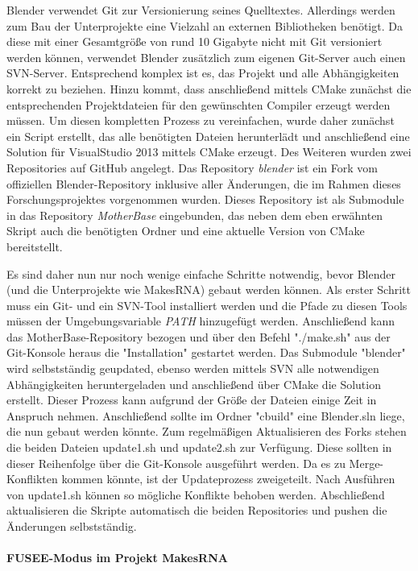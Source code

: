 Blender verwendet Git zur Versionierung seines Quelltextes. Allerdings werden zum Bau der Unterprojekte eine Vielzahl an externen Bibliotheken benötigt. Da diese mit einer Gesamtgröße von rund 10 Gigabyte nicht mit Git versioniert werden können, verwendet Blender zusätzlich zum eigenen Git-Server auch einen SVN-Server. Entsprechend komplex ist es, das Projekt und alle Abhängigkeiten korrekt zu beziehen. Hinzu kommt, dass anschließend mittels CMake zunächst die entsprechenden Projektdateien für den gewünschten Compiler erzeugt werden müssen. Um diesen kompletten Prozess zu vereinfachen, wurde daher zunächst ein Script erstellt, das alle benötigten Dateien herunterlädt und anschließend eine Solution für VisualStudio 2013 mittels CMake erzeugt. Des Weiteren wurden zwei Repositories auf GitHub angelegt. Das Repository \emph{blender} ist ein Fork vom offiziellen Blender-Repository inklusive aller Änderungen, die im Rahmen dieses Forschungsprojektes vorgenommen wurden. Dieses Repository ist als Submodule in das Repository \emph{MotherBase} eingebunden, das neben dem eben erwähnten Skript auch die benötigten Ordner und eine aktuelle Version von CMake bereitstellt.

Es sind daher nun nur noch wenige einfache Schritte notwendig, bevor Blender (und die Unterprojekte wie MakesRNA) gebaut werden können. Als erster Schritt muss ein Git- und ein SVN-Tool installiert werden und die Pfade zu diesen Tools müssen der Umgebungsvariable \emph{PATH} hinzugefügt werden. Anschließend kann das MotherBase-Repository bezogen und über den Befehl "./make.sh" aus der Git-Konsole heraus die "Installation" gestartet werden. Das Submodule "blender" wird selbstständig geupdated, ebenso werden mittels SVN alle notwendigen Abhängigkeiten heruntergeladen und anschließend über CMake die Solution erstellt. Dieser Prozess kann aufgrund der Größe der Dateien einige Zeit in Anspruch nehmen. Anschließend sollte im Ordner "cbuild" eine Blender.sln liege, die nun gebaut werden könnte. Zum regelmäßigen Aktualisieren des Forks stehen die beiden Dateien update1.sh und update2.sh zur Verfügung. Diese sollten in dieser Reihenfolge über die Git-Konsole ausgeführt werden. Da es zu Merge-Konflikten kommen könnte, ist der Updateprozess zweigeteilt. Nach Ausführen von update1.sh können so mögliche Konflikte behoben werden. Abschließend aktualisieren die Skripte automatisch die beiden Repositories und pushen die Änderungen selbstständig.

\paragraph{FUSEE-Modus im Projekt MakesRNA}

